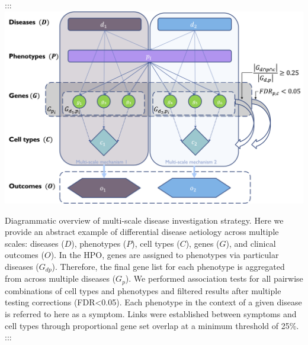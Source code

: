 \documentclass[
]{report}
\begin{document}
::: \includegraphics{img/fig-diagram.png}

Diagrammatic overview of multi-scale disease investigation strategy.
Here we provide an abstract example of differential disease aetiology
across multiple scales: diseases (\(D\)), phenotypes (\(P\)), cell types
(\(C\)), genes (\(G\)), and clinical outcomes (\(O\)). In the HPO, genes
are assigned to phenotypes via particular diseases (\(G_{dp}\)).
Therefore, the final gene list for each phenotype is aggregated from
across multiple diseases (\(G_{p}\)). We performed association tests for
all pairwise combinations of cell types and phenotypes and filtered
results after multiple testing corrections (FDR\textless0.05). Each
phenotype in the context of a given disease is referred to here as a
symptom. Links were established between symptoms and cell types through
proportional gene set overlap at a minimum threshold of 25\%. :::

\newpage{}
\end{document}
